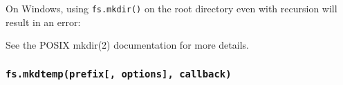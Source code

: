\begin{Shaded}
\begin{Highlighting}[]
 \OperatorTok{;}

\NormalTok{(}\OperatorTok{,}\NormalTok{ \{ }\OperatorTok{:} \NormalTok{ \}}\OperatorTok{,}\KeywordTok{=\textgreater{}}\NormalTok{ \{}
  \OperatorTok{;}
\NormalTok{\})}\OperatorTok{;}
\end{Highlighting}
\end{Shaded}

On Windows, using \texttt{fs.mkdir()} on the root directory even with
recursion will result in an error:

\begin{Shaded}
\begin{Highlighting}[]
 \OperatorTok{;}

\NormalTok{(}\StringTok{\textquotesingle{}/\textquotesingle{}}\OperatorTok{,}\NormalTok{ \{ }\OperatorTok{:} \NormalTok{ \}}\OperatorTok{,}\KeywordTok{=\textgreater{}}\NormalTok{ \{}
\NormalTok{\})}\OperatorTok{;}
\end{Highlighting}
\end{Shaded}

See the POSIX mkdir(2) documentation for more details.

\subsubsection{\texorpdfstring{\texttt{fs.mkdtemp(prefix{[},\ options{]},\ callback)}}{fs.mkdtemp(prefix{[}, options{]}, callback)}}\label{fs.mkdtempprefix-options-callback}

